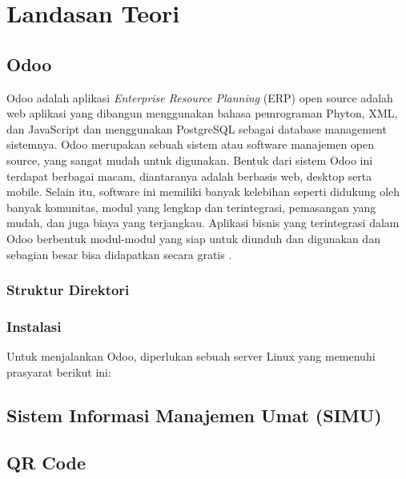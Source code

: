 \chapter{Landasan Teori}
\label{sec:landasanteori}

\section{Odoo}
\label{sec:odoo}

Odoo adalah aplikasi \textit{Enterprise Resource Planning} (ERP) open source adalah web aplikasi yang dibangun menggunakan bahasa pemrograman Phyton, XML, dan JavaScript dan menggunakan PostgreSQL sebagai database management sistemnya.  Odoo merupakan sebuah sistem atau software manajemen open source, yang sangat mudah untuk digunakan. Bentuk dari sistem Odoo ini terdapat berbagai macam, diantaranya adalah berbasis web, desktop serta mobile. Selain itu, software ini memiliki banyak kelebihan seperti didukung oleh banyak komunitas, modul yang lengkap dan terintegrasi, pemasangan yang mudah, dan juga biaya yang terjangkau. Aplikasi bisnis yang terintegrasi dalam Odoo berbentuk modul-modul yang siap untuk diunduh dan digunakan dan sebagian besar bisa didapatkan secara gratis \cite{suminten}.

\subsection{Struktur Direktori}

\subsection{Instalasi}
\label{sec:instalasi}
Untuk menjalankan Odoo, diperlukan sebuah server Linux yang memenuhi prasyarat berikut ini:

\section{Sistem Informasi Manajemen Umat (SIMU)}
\label{sec:simu}

\section{QR Code}
\label{sec:qr}